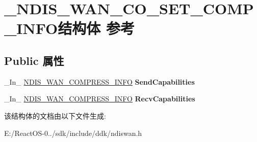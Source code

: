 \hypertarget{struct___n_d_i_s___w_a_n___c_o___s_e_t___c_o_m_p___i_n_f_o}{}\section{\+\_\+\+N\+D\+I\+S\+\_\+\+W\+A\+N\+\_\+\+C\+O\+\_\+\+S\+E\+T\+\_\+\+C\+O\+M\+P\+\_\+\+I\+N\+F\+O结构体 参考}
\label{struct___n_d_i_s___w_a_n___c_o___s_e_t___c_o_m_p___i_n_f_o}
\subsection*{Public 属性}
\begin{DoxyCompactItemize}
\item 
\mbox{\label{struct___n_d_i_s___w_a_n___c_o___s_e_t___c_o_m_p___i_n_f_o_ae265945c0ad342a7bd3725b1f29e576b}} 
\+\_\+\+In\+\_\+ \hyperlink{struct___n_d_i_s___w_a_n___c_o_m_p_r_e_s_s___i_n_f_o}{N\+D\+I\+S\+\_\+\+W\+A\+N\+\_\+\+C\+O\+M\+P\+R\+E\+S\+S\+\_\+\+I\+N\+FO} {\bfseries Send\+Capabilities}
\item 
\mbox{\label{struct___n_d_i_s___w_a_n___c_o___s_e_t___c_o_m_p___i_n_f_o_a3031cbbe27d654cc9187e488567dea0a}} 
\+\_\+\+In\+\_\+ \hyperlink{struct___n_d_i_s___w_a_n___c_o_m_p_r_e_s_s___i_n_f_o}{N\+D\+I\+S\+\_\+\+W\+A\+N\+\_\+\+C\+O\+M\+P\+R\+E\+S\+S\+\_\+\+I\+N\+FO} {\bfseries Recv\+Capabilities}
\end{DoxyCompactItemize}


该结构体的文档由以下文件生成\+:\begin{DoxyCompactItemize}
\item 
E\+:/\+React\+O\+S-\/0../sdk/include/ddk/ndiswan.\+h\end{DoxyCompactItemize}
